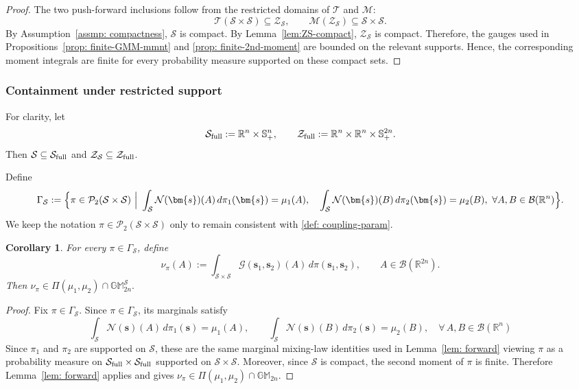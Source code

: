 \documentclass[opre,sglanonrev]{informs4}
\newtheorem{corollary}{Corollary}
\newcommand{\mN}{\mathcal{N}}
\newcommand{\mP}{\mathcal{P}}
\newcommand{\mB}{\mathcal{B}}
\newcommand{\mbR}{\mathbb R}
\newcommand{\mbGM}{\mathbb{GM}}
\newcommand{\bs}{\bm{s}}
\begin{document}
{\begin{APPENDICES}
\begin{proof}
The two push-forward inclusions follow from the restricted domains of
\(\mathcal T\) and \(\mathcal M\):
\[
\mathcal T(\mathcal S\times\mathcal S)\subseteq\mathcal Z_{\mathcal S},
\qquad
\mathcal M(\mathcal Z_{\mathcal S})\subseteq\mathcal S\times\mathcal S.
\]
By Assumption~\ref{assmp: compactness}, \(\mathcal S\) is compact. By
Lemma~\ref{lem:ZS-compact}, \(\mathcal Z_{\mathcal S}\) is compact. Therefore, the gauges used in Propositions~\ref{prop: finite-GMM-mmnt} and
\ref{prop: finite-2nd-moment} are bounded on the relevant supports. Hence, the
corresponding moment integrals are finite for every probability measure
supported on these compact sets.
\end{proof}

\subsubsection{Containment under restricted support}

For clarity, let
\[
\mathcal S_{\rm full}:=\mathbb R^n\times\mathbb S^n_+,
\qquad
\mathcal Z_{\rm full}:=\mathbb R^n\times\mathbb R^n\times\mathbb S^{2n}_+.
\]
Then \(\mathcal S\subseteq\mathcal S_{\rm full}\) and
\(\mathcal Z_{\mathcal S}\subseteq\mathcal Z_{\rm full}\).

Define
\[
\Gamma_{\mathcal S}
:=
  \Bigl\{
    \pi \in \mP_2(\mathcal S \times \mathcal S)
    \ \Big|\ 
   \int_{\mathcal S} \mN(\bs)(A)\,d\pi_1(\bs) = \mu_1(A),\quad
   \int_{\mathcal S} \mN(\bs)(B)\,d\pi_2(\bs) = \mu_2(B),
   \ \forall A,B\in\mB(\mbR^n)
  \Bigr\}.
\]
We keep the notation \(\pi\in\mathcal P_2(\mathcal S\times\mathcal S)\) only to remain consistent with \eqref{def: coupling-param}.

\begin{corollary}
\label{cor:restricted-forward-containment}
For every \(\pi\in\Gamma_{\mathcal S}\), define
\[
\nu_\pi(A)
:=
\int_{\mathcal S\times\mathcal S}
\mathcal G(\bs_1,\bs_2)(A)\,d\pi(\bs_1,\bs_2),
\qquad A\in\mathcal B(\mbR^{2n}).
\]
Then $\nu_\pi\in\Pi(\mu_1,\mu_2)\cap\mbGM_{2n}^{\mathcal S}.$
\end{corollary}

\begin{proof}
Fix \(\pi\in\Gamma_{\mathcal S}\).  Since \(\pi\in\Gamma_{\mathcal S}\), its
marginals satisfy
\[
\int_{\mathcal S}\mN(\bs)(A)\,d\pi_1(\bs)=\mu_1(A),
\qquad
\int_{\mathcal S}\mN(\bs)(B)\,d\pi_2(\bs)=\mu_2(B), \quad \forall \, A,B\in\mathcal B(\mbR^n)
\]
Since \(\pi_1\) and \(\pi_2\) are
supported on \(\mathcal S\), these are the same marginal mixing-law identities
used in Lemma~\ref{lem: forward} viewing \(\pi\) as a probability measure on
\(\mathcal S_{\rm full}\times\mathcal S_{\rm full}\) supported on \(\mathcal S\times\mathcal S\). Moreover, since \(\mathcal S\) is compact, the second moment of \(\pi\) is finite. Therefore Lemma~\ref{lem: forward} applies and
gives $\nu_\pi\in\Pi(\mu_1,\mu_2)\cap\mbGM_{2n}.$


\end{proof}
\end{APPENDICES}}
\end{document}

